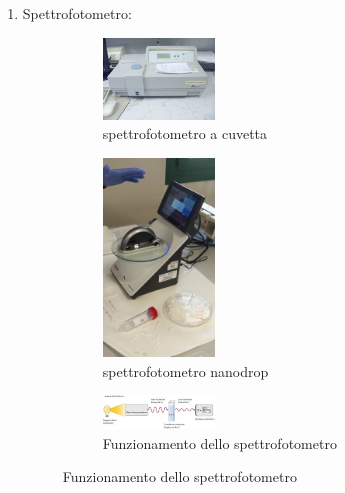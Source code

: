 \documentclass{article}
\begin{document}
\begin{enumerate}
\begin{figure}[H]
		\end{figure}

		\vspace{0.5cm}


		\item Spettrofotometro:

		\begin{figure}[H]
			\centering

				\begin{subfigure}[b]{1\textwidth}

					\centering
			  	\includegraphics[width=0.35\textwidth]{./immagini/spettrofotometro.jpg}
					\caption{spettrofotometro a cuvetta}
					\label{spettrofotometro_cuvetta}

				\end{subfigure}

				\qquad

				\begin{subfigure}[b]{1\textwidth}
					\centering
					\includegraphics[width=0.35\textwidth]{./immagini/spettrofotometro_nanodrop.jpg}
					\caption{spettrofotometro nanodrop}
					\label{spettrofotometro_nanodrop}
				\end{subfigure}

				\quad

				\begin{subfigure}[b]{1\textwidth}

					\centering
			  	\includegraphics[width=0.35\textwidth]{./immagini/assorbanza.jpeg}
					\caption{Funzionamento dello spettrofotometro}
					\label{assorbanza}


\end{subfigure}
\end{figure}
\end{enumerate}
\end{document}
